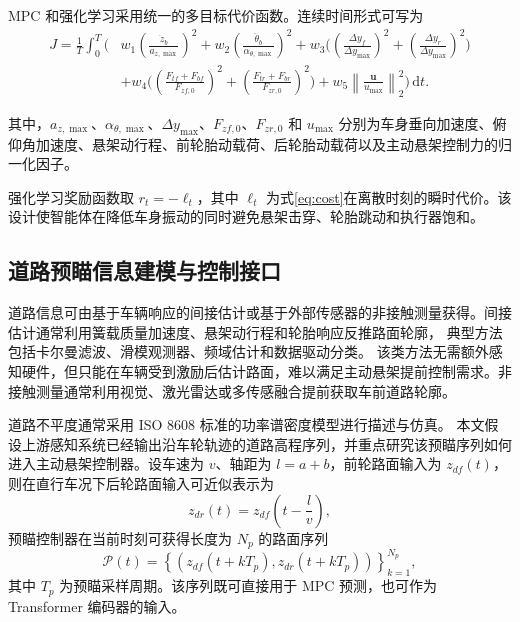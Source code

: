 MPC 和强化学习采用统一的多目标代价函数。连续时间形式可写为
\begin{equation}
\begin{aligned}
J=\frac{1}{T}\int_0^T
\Bigg(
&w_1\left(\frac{\ddot z_b}{a_{z,\max}}\right)^2
+w_2\left(\frac{\ddot\theta_b}{\alpha_{\theta,\max}}\right)^2+w_3\bigg(
\left(\frac{\Delta y_f}{\Delta y_{\max}}\right)^2
+\left(\frac{\Delta y_r}{\Delta y_{\max}}\right)^2
\bigg)  \\
&+w_4\bigg(
\left(\frac{F_{tf}+F_{bf}}{F_{zf,0}}\right)^2
+\left(\frac{F_{tr}+F_{br}}{F_{zr,0}}\right)^2
\bigg)+w_5\left\|\frac{\boldsymbol u}{u_{\max}}\right\|_2^2
\Bigg)\,\mathrm{d}t .
\end{aligned}
\label{eq:cost}
\end{equation}

其中，$a_{z,\max}$、$\alpha_{\theta,\max}$、$\Delta y_{\max}$、$F_{zf,0}$、$F_{zr,0}$ 和 $u_{\max}$ 分别为车身垂向加速度、俯仰角加速度、悬架动行程、前轮胎动载荷、后轮胎动载荷以及主动悬架控制力的归一化因子。

强化学习奖励函数取 $r_t=-\ell_t$，其中 $\ell_t$ 为式\eqref{eq:cost}在离散时刻的瞬时代价。该设计使智能体在降低车身振动的同时避免悬架击穿、轮胎跳动和执行器饱和。

\subsection{道路预瞄信息建模与控制接口}
道路信息可由基于车辆响应的间接估计或基于外部传感器的非接触测量获得。间接估计通常利用簧载质量加速度、悬架动行程和轮胎响应反推路面轮廓，
典型方法包括卡尔曼滤波、滑模观测器、频域估计和数据驱动分类\cite{Tu2015adaptive,liu2020line,Qin2015road,kang2019roughness,falahati2021observer}。
该类方法无需额外感知硬件，但只能在车辆受到激励后估计路面，难以满足主动悬架提前控制需求。非接触测量通常利用视觉、激光雷达或多传感融合提前获取车前道路轮廓\cite{zhao2023comprehensive,cheng2019road,yang2021automatic,dewangan2021rcnet,ni2020roadprofile}。

道路不平度通常采用 ISO 8608 标准的功率谱密度模型进行描述与仿真\cite{mucka2020wbv,mucka2021vdv,johannesson2016roughness,hua2018random,hari2022spectral}。
本文假设上游感知系统已经输出沿车轮轨迹的道路高程序列，并重点研究该预瞄序列如何进入主动悬架控制器。设车速为 $v$、轴距为 $l=a+b$，前轮路面输入为 $z_{df}(t)$，则在直行车况下后轮路面输入可近似表示为
\begin{equation}
z_{dr}(t)=z_{df}\left(t-\frac{l}{v}\right),
\label{eq:rear_delay}
\end{equation}
预瞄控制器在当前时刻可获得长度为 $N_p$ 的路面序列
\begin{equation}
\mathcal{P}(t)=\left\{\left(z_{df}(t+kT_p),z_{dr}(t+kT_p)\right)\right\}_{k=1}^{N_p},
\label{eq:preview_seq}
\end{equation}
其中 $T_p$ 为预瞄采样周期。该序列既可直接用于 MPC 预测，也可作为 Transformer 编码器的输入。

